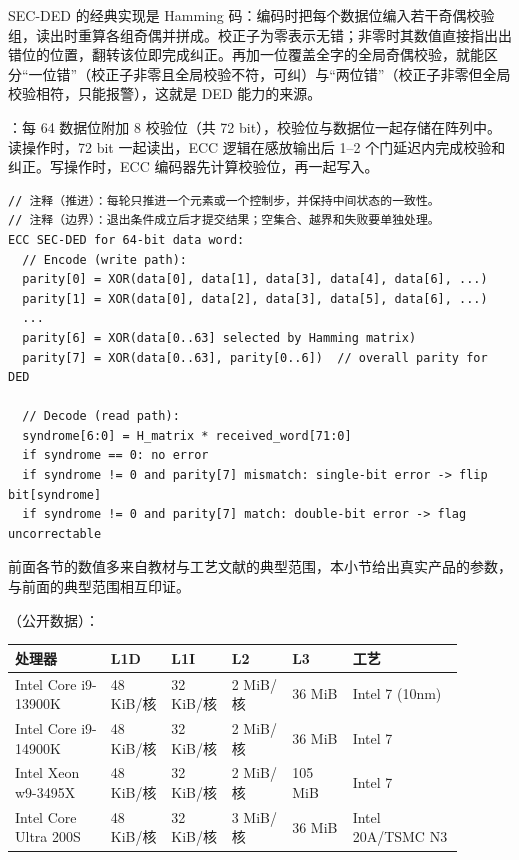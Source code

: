 SEC-DED 的经典实现是 Hamming 码：编码时把每个数据位编入若干奇偶校验组，读出时重算各组奇偶并拼成。校正子为零表示无错；非零时其数值直接指出出错位的位置，翻转该位即完成纠正。再加一位覆盖全字的全局奇偶校验，就能区分“一位错”（校正子非零且全局校验不符，可纠）与“两位错”（校正子非零但全局校验相符，只能报警），这就是 DED 能力的来源。

：每 64 数据位附加 8 校验位（共 72 bit），校验位与数据位一起存储在阵列中。读操作时，72 bit 一起读出，ECC 逻辑在感放输出后 1--2 个门延迟内完成校验和纠正。写操作时，ECC 编码器先计算校验位，再一起写入。

\begin{lstlisting}
// 注释（推进）：每轮只推进一个元素或一个控制步，并保持中间状态的一致性。
// 注释（边界）：退出条件成立后才提交结果；空集合、越界和失败要单独处理。
ECC SEC-DED for 64-bit data word:
  // Encode (write path):
  parity[0] = XOR(data[0], data[1], data[3], data[4], data[6], ...)
  parity[1] = XOR(data[0], data[2], data[3], data[5], data[6], ...)
  ...
  parity[6] = XOR(data[0..63] selected by Hamming matrix)
  parity[7] = XOR(data[0..63], parity[0..6])  // overall parity for DED

  // Decode (read path):
  syndrome[6:0] = H_matrix * received_word[71:0]
  if syndrome == 0: no error
  if syndrome != 0 and parity[7] mismatch: single-bit error -> flip bit[syndrome]
  if syndrome != 0 and parity[7] match: double-bit error -> flag uncorrectable
\end{lstlisting}


前面各节的数值多来自教材与工艺文献的典型范围，本小节给出真实产品的参数，与前面的典型范围相互印证。

（公开数据）：

\begin{longtable}{L{0.19\linewidth}L{0.12\linewidth}L{0.12\linewidth}L{0.12\linewidth}L{0.12\linewidth}L{0.22\linewidth}}
\toprule
处理器 & L1D & L1I & L2 & L3 & 工艺 \\
\midrule
Intel Core i9-13900K & 48 KiB/核 & 32 KiB/核 & 2 MiB/核 & 36 MiB & Intel 7 (10nm) \\\tablerowrule
Intel Core i9-14900K & 48 KiB/核 & 32 KiB/核 & 2 MiB/核 & 36 MiB & Intel 7 \\\tablerowrule
Intel Xeon w9-3495X & 48 KiB/核 & 32 KiB/核 & 2 MiB/核 & 105 MiB & Intel 7 \\\tablerowrule
Intel Core Ultra 200S & 48 KiB/核 & 32 KiB/核 & 3 MiB/核 & 36 MiB & Intel 20A/TSMC N3 \\
\bottomrule
\end{longtable}

